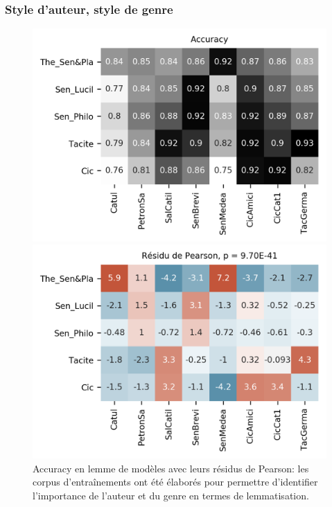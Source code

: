 \subsubsection{Style d'auteur, style de genre}

\begin{figure}[ht]
    \hspace*{-0.05\linewidth}
    \begin{minipage}[c]{0.55\linewidth}
        \includegraphics[width=1\linewidth]{results/lemmatisation/longreeVariante/LongreeVariante-AccuracyStyleDAuteurStyleDeGenre-Lemme.png}
    \end{minipage} \hfill
    \begin{minipage}[c]{0.55\linewidth}
        \includegraphics[width=1\linewidth]{results/lemmatisation/longreeVariante/LongreeVariante-AssocPlotStyleDAuteurStyleDeGenre-Lemme.png}
    \end{minipage}
    \caption{Accuracy en lemme de modèles avec leurs résidus de Pearson: les corpus d'entraînements ont été élaborés pour permettre d'identifier l'importance de l'auteur et du genre en termes de lemmatisation.}
    \label{fig:lemmatisation:longree:auteurVSforme}
\end{figure}

